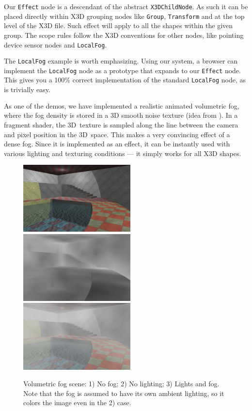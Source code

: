 \documentclass{acmsiggraph}                     %
\begin{document}
Our \texttt{Effect} node is a descendant of the abstract \texttt{X3DChildNode}.
As such it can be placed directly within X3D grouping nodes like
\texttt{Group}, \texttt{Transform} and at the top level of the X3D file.
Such effect will apply to all the shapes within the given group.
The scope rules follow the X3D conventions for other nodes,
like pointing device sensor nodes and \texttt{LocalFog}.

The \texttt{LocalFog} example is worth emphasizing. Using our system,
a browser can implement the \texttt{LocalFog} node as a prototype
that expands to our \texttt{Effect} node. This gives you a 100\% correct
implementation of the standard \texttt{LocalFog} node, as is trivially easy.

As one of the demos, we have implemented a realistic
animated volumetric fog, where the fog density is stored in
a 3D smooth noise texture (idea from \cite{humus:volumetricfog}).
In a fragment shader, the 3D~texture is sampled
along the line between the camera and pixel position in the 3D~space. This makes a very
convincing effect of a dense fog. Since it is implemented as an effect,
it can be instantly used with various lighting and texturing conditions
--- it simply works for all X3D shapes.

\begin{figure}[t]
  \centering
  \includegraphics[width=2.3in]{volumetric_animated_fog_no_fog}
  \includegraphics[width=2.3in]{volumetric_animated_fog_no_light}
  \includegraphics[width=2.3in]{volumetric_animated_fog_all}
  \caption{Volumetric fog scene: 1) No fog; 2) No lighting; 3) Lights and fog.
Note that the fog is assumed to have its own ambient lighting,
so it colors the image even in the 2) case.}
\end{figure}
\end{document}
